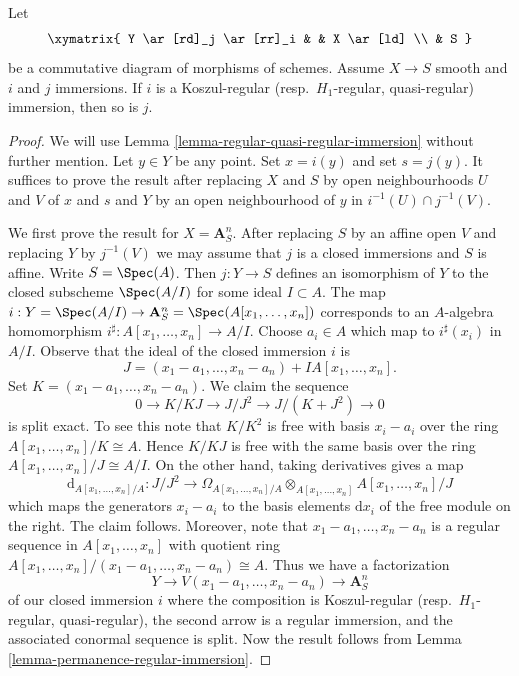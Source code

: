 \begin{lemma}
\label{lemma-push-regular-immersion-thru-smooth}
Let
$$
\xymatrix{
Y \ar[rd]_j \ar[rr]_i & & X \ar[ld] \\
& S
}
$$
be a commutative diagram of morphisms of schemes.
Assume $X \to S$ smooth and $i$ and $j$ immersions.
If $i$ is a Koszul-regular (resp.\ $H_1$-regular, quasi-regular)
immersion, then so is $j$.
\end{lemma}

\begin{proof}
We will use Lemma \ref{lemma-regular-quasi-regular-immersion}
without further mention.
Let $y \in Y$ be any point. Set $x = i(y)$ and set $s = j(y)$.
It suffices to prove the result after replacing $X$ and $S$ by open
neighbourhoods $U$ and $V$ of $x$ and $s$ and $Y$ by an open neighbourhood
of $y$ in $i^{-1}(U) \cap j^{-1}(V)$.

\medskip\noindent
We first prove the result for $X = \mathbf{A}^n_S$. After replacing $S$
by an affine open $V$ and replacing $Y$ by $j^{-1}(V)$ we may assume that
$j$ is a closed immersions and $S$ is affine. Write $S = \Spec(A)$.
Then $j : Y \to S$ defines an isomorphism of $Y$ to the closed subscheme
$\Spec(A/I)$ for some ideal $I \subset A$. The map
$i : Y = \Spec(A/I) \to
\mathbf{A}^n_S = \Spec(A[x_1, \ldots, x_n])$
corresponds to an $A$-algebra homomorphism
$i^\sharp : A[x_1, \ldots, x_n] \to A/I$.
Choose $a_i \in A$ which map to $i^\sharp(x_i)$ in $A/I$.
Observe that the ideal of the closed immersion $i$ is
$$
J = (x_1 - a_1, \ldots, x_n - a_n) + IA[x_1, \ldots, x_n].
$$
Set $K = (x_1 - a_1, \ldots, x_n - a_n)$. We claim the sequence
$$
0 \to K/KJ \to J/J^2 \to J/(K + J^2) \to 0
$$
is split exact. To see this note that $K/K^2$ is free with basis
$x_i - a_i$ over the ring $A[x_1, \ldots, x_n]/K \cong A$.
Hence $K/KJ$ is free with the same basis over the ring
$A[x_1, \ldots, x_n]/J \cong A/I$. On the other hand, taking derivatives
gives a map
$$
\text{d}_{A[x_1, \ldots, x_n]/A} :
J/J^2
\longrightarrow
\Omega_{A[x_1, \ldots, x_n]/A} \otimes_{A[x_1, \ldots, x_n]}
A[x_1, \ldots, x_n]/J
$$
which maps the generators $x_i - a_i$ to the basis elements $\text{d}x_i$
of the free module on the right. The claim follows. Moreover, note that
$x_1 - a_1, \ldots, x_n - a_n$ is a regular sequence in
$A[x_1, \ldots, x_n]$ with quotient ring
$A[x_1, \ldots, x_n]/(x_1 - a_1, \ldots, x_n - a_n) \cong A$.
Thus we have a factorization
$$
Y \to V(x_1 - a_1, \ldots, x_n - a_n) \to \mathbf{A}^n_S
$$
of our closed immersion $i$ where the composition is
Koszul-regular (resp.\ $H_1$-regular, quasi-regular),
the second arrow is a regular immersion, and the associated conormal
sequence is split. Now the result follows from
Lemma \ref{lemma-permanence-regular-immersion}.


\end{proof}
